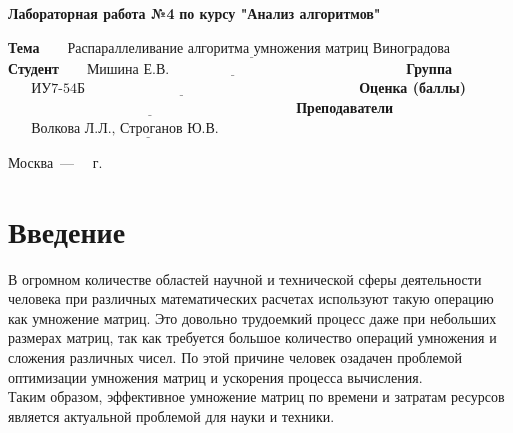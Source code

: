 \documentclass[12pt, a4paper]{report}
\begin{document}
\begin{titlepage}
		
		\begin{center}
			\Large\textbf{Лабораторная работа №4}\newline
			\Large\textbf{по курсу "Анализ алгоритмов"}\newline
		\end{center}
	
		\noindent\textbf{Тема} $\underline{\text{~~~~~Распараллеливание алгоритма умножения матриц Виноградова~~}}$\newline\newline\newline
		\noindent\textbf{Студент} $\underline{\text{~~~~~Мишина Е.В.~~~~~~~~~~~~~~~~~~~~~~~~~~~~~~~~~~~~~~~~~~~~~~~~~~}}$\newline\newline
		\noindent\textbf{Группа} $\underline{\text{~~~~~ИУ7-54Б~~~~~~~~~~~~~~~~~~~~~~~~~~~~~~~~~~~~~~~~~~~~~~~~~~~~~~~~~~}}$\newline\newline
		\noindent\textbf{Оценка (баллы)} $\underline{\text{~~~~~~~~~~~~~~~~~~~~~~~~~~~~~~~~~~~~~~~~~~~~~~~~~~~~~~~~~~~~~}}$\newline\newline
		\noindent\textbf{Преподаватели} $\underline{\text{~~~~~Волкова Л.Л., Строганов Ю.В.~~~~~~~~~~~~~~~}}$\newline
		
		\begin{center}
			\vfill
			Москва~---~\the\year
			~г.
		\end{center}
	\restoregeometry
	\end{titlepage}
	
	\tableofcontents

	\chapter*{Введение}
	
	\hspace{1cm}В огромном количестве областей научной и технической сферы деятельности человека при различных математических расчетах используют такую операцию как умножение матриц. Это довольно трудоемкий процесс даже при небольших размерах матриц, так как требуется большое количество операций умножения и сложения различных чисел. По этой причине человек озадачен проблемой оптимизации умножения матриц и ускорения процесса вычисления.\\
	Таким образом, эффективное умножение матриц по времени и затратам ресурсов является актуальной проблемой для науки и техники.
\end{document}
